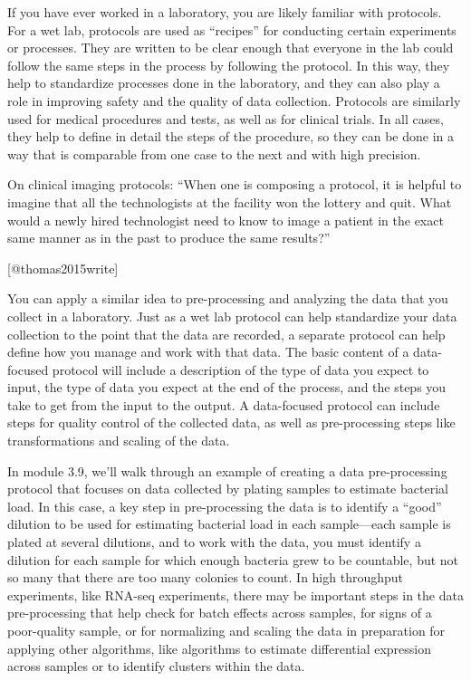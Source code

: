 \documentclass[]{tufte-book}
\begin{document}
If you have ever worked in a laboratory, you are likely familiar with protocols.
For a wet lab, protocols are used as ``recipes'' for conducting certain
experiments or processes. They are written to be clear enough that everyone in
the lab could follow the same steps in the process by following the protocol. In
this way, they help to standardize processes done in the laboratory, and they
can also play a role in improving safety and the quality of data collection.
Protocols are similarly used for medical procedures and
tests, as well as for clinical trials. In all cases, they help to define in
detail the steps of the procedure, so they can be done in a way that is
comparable from one case to the next and with high precision.

\begin{marginfigure}
On clinical imaging protocols: ``When one is composing a protocol, it is
helpful to imagine that all the technologists at the facility won the
lottery and quit. What would a newly hired technologist need to know to
image a patient in the exact same manner as in the past to produce the
same results?''

{[}@thomas2015write{]}
\end{marginfigure}

You can apply a similar idea to pre-processing and analyzing the data that you
collect in a laboratory. Just as a wet lab protocol can help standardize your
data collection to the point that the data are recorded, a separate protocol
can help define how you manage and work with that data.
The basic content of a data-focused protocol will include a description of the type of data
you expect to input, the type of data you expect at the end of the process,
and the steps you take to get from the input to the output.
A data-focused protocol can include steps for quality control of the
collected data, as well as pre-processing steps like transformations and
scaling of the data.

In module 3.9, we'll walk through an example of creating a data pre-processing
protocol that focuses on data collected by plating samples to estimate
bacterial load. In this case, a key step in pre-processing the data is to
identify a ``good'' dilution to be used for estimating bacterial load in each
sample---each sample is plated at several dilutions, and to work with the data,
you must identify a dilution for each sample for which enough bacteria grew to
be countable, but not so many that there are too many colonies to count. In high
throughput experiments, like RNA-seq experiments, there may be important steps
in the data pre-processing that help check for batch effects across samples, for
signs of a poor-quality sample, or for normalizing and scaling the data in
preparation for applying other algorithms, like algorithms to estimate
differential expression across samples or to identify clusters within the data.
\end{document}
